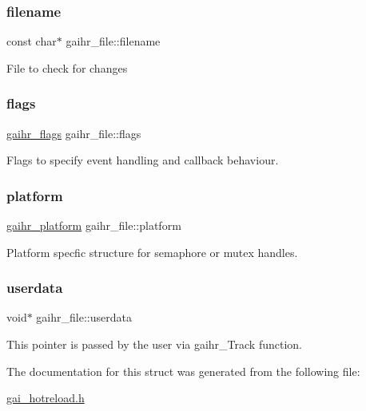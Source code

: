 \subsubsection{\texorpdfstring{filename}{filename}}
{\footnotesize\ttfamily const char$\ast$ gaihr\+\_\+file\+::filename}

File to check for changes \mbox{\label{structgaihr__file_ab6eef82d50a8a51d161de3ab7ad98ee9}} 
\subsubsection{\texorpdfstring{flags}{flags}}
{\footnotesize\ttfamily \hyperlink{gai__hotreload_8h_aaebb069b6896f065efd75640e0e4150b}{gaihr\+\_\+flags} gaihr\+\_\+file\+::flags}

Flags to specify event handling and callback behaviour. \mbox{\label{structgaihr__file_a138044c270d5f0e83917ae2841efe8b7}} 
\subsubsection{\texorpdfstring{platform}{platform}}
{\footnotesize\ttfamily \hyperlink{structgaihr__platform}{gaihr\+\_\+platform} gaihr\+\_\+file\+::platform}

Platform specfic structure for semaphore or mutex handles. \mbox{\label{structgaihr__file_a06bf963cb9c08e69fcc6c4bb3140a2b8}} 
\subsubsection{\texorpdfstring{userdata}{userdata}}
{\footnotesize\ttfamily void$\ast$ gaihr\+\_\+file\+::userdata}

This pointer is passed by the user via gaihr\+\_\+\+Track function. 

The documentation for this struct was generated from the following file\+:\begin{DoxyCompactItemize}
\item 
\hyperlink{gai__hotreload_8h}{gai\+\_\+hotreload.\+h}\end{DoxyCompactItemize}
